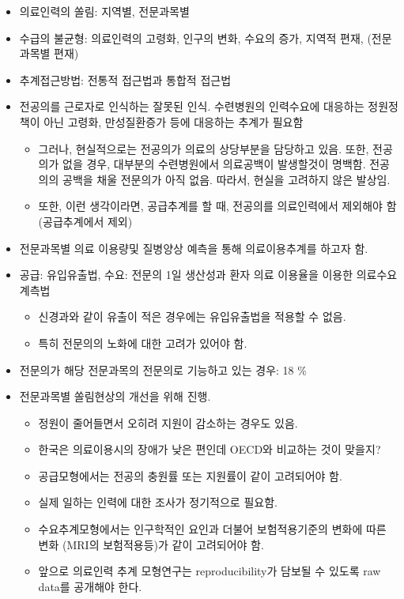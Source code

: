 \documentclass[]{book}
\providecommand{\tightlist}{%
  \setlength{\itemsep}{0pt}\setlength{\parskip}{0pt}}
\begin{document}
\begin{itemize}
\item
  의료인력의 쏠림: 지역별, 전문과목별
\item
  수급의 불균형: 의료인력의 고령화, 인구의 변화, 수요의 증가, 지역적 편재, (전문과목별 편재)
\item
  추계접근방법: 전통적 접근법과 통합적 접근법
\item
  전공의를 근로자로 인식하는 잘못된 인식. 수련병원의 인력수요에 대응하는 정원정책이 아닌 고령화, 만성질환증가 등에 대응하는 추계가 필요함

  \begin{itemize}
  \tightlist
  \item
    그러나, 현실적으로는 전공의가 의료의 상당부분을 담당하고 있음. 또한, 전공의가 없을 경우, 대부분의 수련병원에서 의료공백이 발생할것이 명백함. 전공의의 공백을 채울 전문의가 아직 없음. 따라서, 현실을 고려하지 않은 발상임.
  \item
    또한, 이런 생각이라면, 공급추계를 할 때, 전공의를 의료인력에서 제외해야 함 (공급추계에서 제외)
  \end{itemize}
\item
  전문과목별 의료 이용량및 질병양상 예측을 통해 의료이용추계를 하고자 함.
\item
  공급: 유입유출법, 수요: 전문의 1일 생산성과 환자 의료 이용율을 이용한 의료수요 계측법

  \begin{itemize}
  \tightlist
  \item
    신경과와 같이 유출이 적은 경우에는 유입유출법을 적용할 수 없음.
  \item
    특히 전문의의 노화에 대한 고려가 있어야 함.
  \end{itemize}
\item
  전문의가 해당 전문과목의 전문의로 기능하고 있는 경우: 18 \%
\item
  전문과목별 쏠림현상의 개선을 위해 진행.

  \begin{itemize}
  \item
    정원이 줄어들면서 오히려 지원이 감소하는 경우도 있음.
  \item
    한국은 의료이용시의 장애가 낮은 편인데 OECD와 비교하는 것이 맞을지?
  \item
    공급모형에서는 전공의 충원률 또는 지원률이 같이 고려되어야 함.
  \item
    실제 일하는 인력에 대한 조사가 정기적으로 필요함.
  \item
    수요추계모형에서는 인구학적인 요인과 더불어 보험적용기준의 변화에 따른 변화 (MRI의 보험적용등)가 같이 고려되어야 함.
  \item
    앞으로 의료인력 추계 모형연구는 reproducibility가 담보될 수 있도록 raw data를 공개해야 한다.
  \end{itemize}
\end{itemize}
\end{document}
